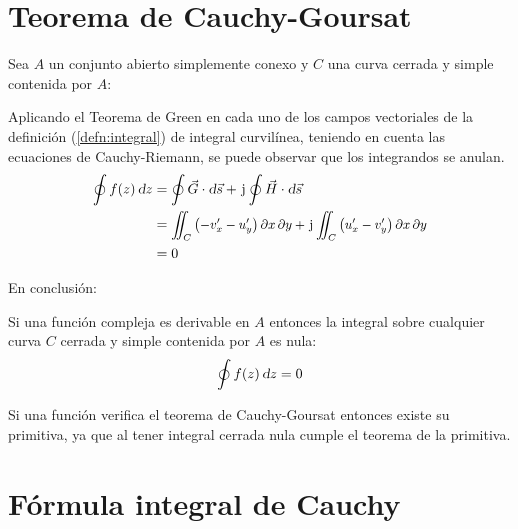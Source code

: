 \section{Teorema de Cauchy-Goursat}
\label{sec:CauchyGoursat}

Sea $A$ un conjunto abierto simplemente conexo y $C$ una curva cerrada y simple contenida por $A$:

\begin{center}
    \def\svgwidth{0.6\linewidth}
    
\end{center}

Aplicando el Teorema de Green en cada uno de los campos vectoriales de la definición (\ref{defn:integral}) de integral curvilínea, teniendo en cuenta las ecuaciones de Cauchy-Riemann, se puede observar que los integrandos se anulan.
\begin{align*}
    \oint f(z) \, \dif z &= \oint \Vec{G} \cdot \dif \Vec{s} + \iu \oint \Vec{H} \cdot \dif \Vec{s}
    \\
    &=
    \scale{0.93}{
    \iint_C \left( -v'_x - u'_y \right) \partial x \, \partial y + \iu \iint_C \left( u'_x-v'_y \right) \partial x \, \partial y
    }
    \\
    &= 0
\end{align*}

En conclusión:

\begin{mdframed}[style=PropertyFrame]
    \begin{prop}
    \end{prop}
    Si una función compleja es derivable en $A$ entonces la integral sobre cualquier curva $C$ cerrada y simple contenida por $A$ es nula:
    \begin{equation*}
        \oint f(z) \, \textsl{d} z = 0
    \end{equation*}
\end{mdframed}

\begin{mdframed}[style=PropertyFrame]
    \begin{prop}
    \end{prop}
    Si una función verifica el teorema de Cauchy-Goursat entonces existe su primitiva, ya que al tener integral cerrada nula cumple el teorema de la primitiva.
\end{mdframed}


\section{Fórmula integral de Cauchy}
\label{sec:CauchyFormula}

